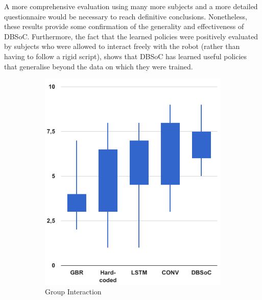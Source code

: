 \documentclass[letterpaper, 10 pt, conference]{ieeeconf}
\begin{document}
A more comprehensive evaluation using many more subjects and a more detailed questionnaire would be necessary to reach definitive conclusions.  Nonetheless, these results provide some confirmation of the generality and effectiveness of DBSoC. Furthermore, the fact that the learned policies were positively evaluated by subjects who were allowed to interact freely with the robot (rather than having to follow a rigid script), shows that DBSoC has learned useful policies that generalise beyond the data on which they were trained.

	\begin{figure}[tbh]
      \begin{subfigure}[b]{0.40\columnwidth}
    \includegraphics[scale = 0.30]{images/group_candle.png}
    \caption{Group Interaction}
    \label{fig:static-res}
  \end{subfigure}
  \hspace{5mm}
  \begin{subfigure}[b]{0.40\columnwidth}

\end{subfigure}
\end{figure}
\end{document}
